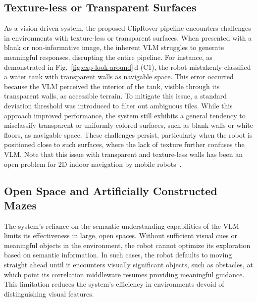 \subsection{Texture-less or Transparent Surfaces}
As a vision-driven system, the proposed ClipRover pipeline encounters challenges in environments with texture-less or transparent surfaces. When presented with a blank or non-informative image, the inherent VLM struggles to generate meaningful responses, disrupting the entire pipeline. For instance, as demonstrated in Fig.~\ref{fig:exp-look-around}\,d (C1), the robot mistakenly classified a water tank with transparent walls as navigable space. This error occurred because the VLM perceived the interior of the tank, visible through its transparent walls, as accessible terrain. To mitigate this issue, a standard deviation threshold was introduced to filter out ambiguous tiles. While this approach improved performance, the system still exhibits a general tendency to misclassify transparent or uniformly colored surfaces, such as blank walls or white floors, as navigable space. These challenges persist, particularly when the robot is positioned close to such surfaces, where the lack of texture further confuses the VLM. Note that this issue with transparent and texture-less walls has been an open problem for 2D indoor navigation by mobile robots~\cite{zhou2017fast}. 


\subsection{Open Space and Artificially Constructed Mazes}
The system's reliance on the semantic understanding capabilities of the VLM limits its effectiveness in large, open spaces. Without sufficient visual cues or meaningful objects in the environment, the robot cannot optimize its exploration based on semantic information. In such cases, the robot defaults to moving straight ahead until it encounters visually significant objects, such as obstacles, at which point its correlation middleware resumes providing meaningful guidance. This limitation reduces the system's efficiency in environments devoid of distinguishing visual features.

